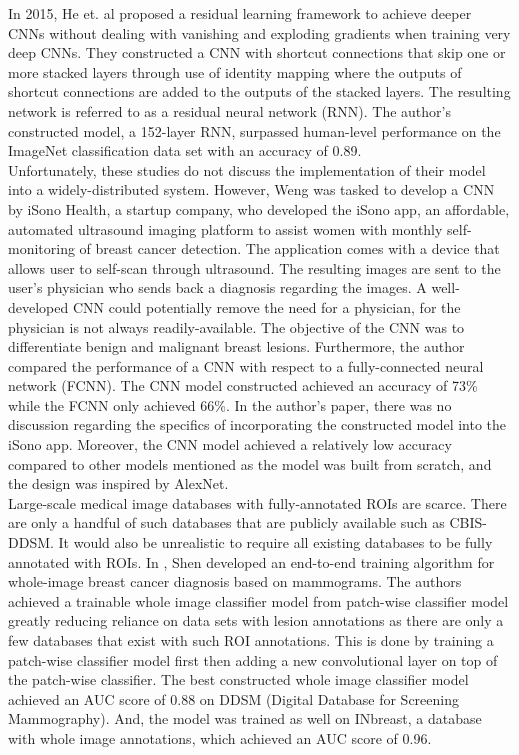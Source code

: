 	In 2015, He et. al \cite{Resnet} proposed a residual learning framework to achieve deeper CNNs without dealing with vanishing and exploding gradients when training very deep CNNs. They constructed a CNN with shortcut connections that skip one or more stacked layers through use of identity mapping where the outputs of shortcut connections are added to the outputs of the stacked layers. The resulting network is referred to as a residual neural network (RNN). The author's constructed model, a 152-layer RNN, surpassed human-level performance on the ImageNet classification data set with an accuracy of 0.89. \\

	Unfortunately, these studies do not discuss the implementation of their model into a widely-distributed system. However, Weng \cite{weng} was tasked to develop a CNN by iSono Health, a startup company, who developed the iSono app, an affordable, automated ultrasound imaging platform to assist women with monthly self-monitoring of breast cancer detection. The application comes with a device that allows user to self-scan through ultrasound. The resulting images are sent to the user's physician who sends back a diagnosis regarding the images. A well-developed CNN could potentially remove the need for a physician, for the physician is not always readily-available. The objective of the CNN was to differentiate benign and malignant breast lesions. Furthermore, the author compared the performance of a CNN with respect to a fully-connected neural network (FCNN). The CNN model constructed achieved an accuracy of 73\% while the FCNN only achieved 66\%. In the author's paper, there was no discussion regarding the specifics of incorporating the constructed model into the iSono app.  Moreover, the CNN model achieved a relatively low accuracy compared to other models mentioned as the model was built from scratch, and the design was inspired by AlexNet. \\

	Large-scale medical image databases with fully-annotated ROIs are scarce. There are only a handful of such databases that are publicly available such as CBIS-DDSM. It would also be unrealistic to require all existing databases to be fully annotated with ROIs. In \cite{CNNmodel}, Shen developed an end-to-end training algorithm for whole-image breast cancer diagnosis based on mammograms. The authors achieved a trainable whole image classifier model from patch-wise classifier model greatly reducing reliance on data sets with lesion annotations as there are only a few databases that exist with such ROI annotations. This is done by training a patch-wise classifier model first then adding a new convolutional layer on top of the patch-wise classifier. The best constructed whole image classifier model achieved an AUC score of 0.88 on DDSM (Digital Database for Screening Mammography). And, the model was trained as well on INbreast, a database with whole image annotations, which achieved an AUC score of 0.96.
